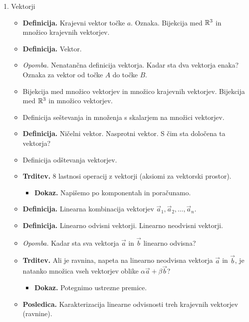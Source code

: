 \begin{enumerate}
    \item Vektorji
    \begin{itemize}
        \item \colorbox{purple!30}{\textbf{Definicija.}} Krajevni vektor točke $a$. Oznaka. Bijekcija med $\mathbb{R}^3$ in množico krajevnih vektorjev.
        \item \colorbox{purple!30}{\textbf{Definicija.}} Vektor.
        \item \colorbox{yellow!30}{\emph{Opomba.}} Nenatančna definicija vektorja. Kadar sta dva vektorja enaka? Oznaka za vektor od točke $A$ do točke $B$.
        \item Bijekcija med množico vektorjev in množico krajevnih vektorjev. Bijekcija med $\mathbb{R}^3$ in množico vektorjev.
        \item Definicija seštevanja in množenja s skalarjem na množici vektorjev.
        \item \colorbox{purple!30}{\textbf{Definicija.}} Ničelni vektor. Nasprotni vektor. S čim sta določena ta vektorja?
        \item Definicija odštevanja vektorjev.
        \item \colorbox{blue!30}{\textbf{Trditev.}} 8 lastnosi operacij z vektorji (aksiomi za vektorski prostor).
        \begin{itemize}
            \item \colorbox{green!30}{\textbf{Dokaz.}} Napišemo po komponentah in poračunamo.
        \end{itemize}
        \item \colorbox{purple!30}{\textbf{Definicija.}} Linearna kombinacija vektorjev $\vec{a}_1, \vec{a}_2, \ldots, \vec{a}_n$.
        \item \colorbox{purple!30}{\textbf{Definicija.}} Linearno odvisni vektorji. Linearno neodvisni vektorji.
        \item \colorbox{yellow!30}{\emph{Opomba.}} Kadar sta sva vektorja $\vec{a}$ in $\vec{b}$ linearno odvisna?
        \item \colorbox{blue!30}{\textbf{Trditev.}} Ali je ravnina, napeta na linearno neodvisna vektorja $\vec{a}$ in $\vec{b}$, je natanko množica vseh vektorjev oblike $\alpha \vec{a} + \beta \vec{b}$?
        \begin{itemize}
            \item \colorbox{green!30}{\textbf{Dokaz.}} Potegnimo ustrezne premice.
        \end{itemize}
        \item \colorbox{orange!30}{\textbf{Posledica.}} Karakterizacija linearne odvisnosti treh krajevnih vektorjev (ravnine).

\end{itemize}
\end{enumerate}
